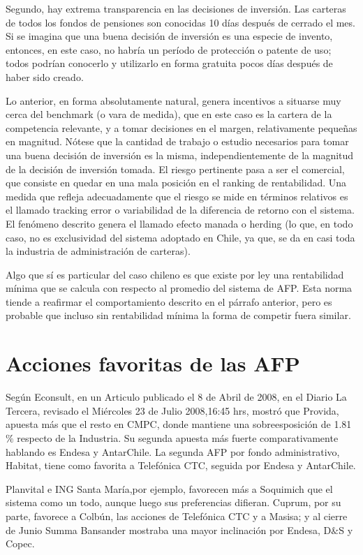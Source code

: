 Segundo, hay extrema transparencia en las decisiones de inversi\'on. Las carteras de todos los fondos de pensiones son conocidas 10 d\'ias despu\'es de cerrado el mes. Si se imagina que una buena decisi\'on de inversi\'on es una especie de invento, entonces, en este caso, no habr\'ia un per\'iodo de protecci\'on o patente de uso; todos podr\'ian conocerlo y utilizarlo en forma gratuita pocos d\'ias despu\'es de haber sido creado.

Lo anterior, en forma absolutamente natural, genera incentivos a situarse muy cerca del benchmark (o vara de medida), que en este caso es la cartera de la competencia relevante, y a tomar decisiones en el margen, relativamente peque\~nas en magnitud. N\'otese que la cantidad de trabajo o estudio necesarios para tomar una buena decisi\'on de inversi\'on es la misma, independientemente de la magnitud de la decisi\'on de inversi\'on tomada. El riesgo pertinente pasa a ser el comercial, que consiste en quedar en una mala posici\'on en el ranking de rentabilidad. Una medida que refleja adecuadamente que el riesgo se mide en t\'erminos relativos es el llamado tracking error o variabilidad de la diferencia de retorno con el sistema. El fen\'omeno descrito genera el llamado efecto manada o herding (lo que, en todo caso, no es exclusividad del sistema adoptado en Chile, ya que, se da en casi toda la industria de administraci\'on de carteras).

Algo que s\'i es particular del caso chileno es que existe por ley una rentabilidad m\'inima que se calcula con respecto al promedio del sistema de AFP. Esta norma tiende a reafirmar el comportamiento descrito en el p\'arrafo anterior, pero es probable que incluso sin rentabilidad m\'inima la forma de competir fuera similar.

\section{Acciones favoritas de las AFP}

Seg\'un Econsult, en un Articulo publicado el 8 de Abril de 2008, en el Diario La Tercera, revisado el Mi\'ercoles 23 de Julio 2008,16:45 hrs, mostr\'o que Provida, apuesta m\'as que el resto en CMPC, donde mantiene una sobreesposici\'on de 1.81$\%$ respecto de la Industria. Su segunda apuesta m\'as fuerte comparativamente hablando es Endesa y AntarChile. La segunda AFP por fondo administrativo, Habitat, tiene como favorita a Telef\'onica CTC, seguida por Endesa y AntarChile.

Planvital e ING Santa Mar\'ia,por ejemplo, favorecen m\'as a Soquimich que el sistema como un todo, aunque luego sus preferencias difieran. Cuprum, por su parte, favorece a Colb\'un, las acciones de Telef\'onica CTC y a Masisa; y al cierre de Junio Summa Bansander mostraba una mayor inclinaci\'on por Endesa, D$\&$S y Copec.
